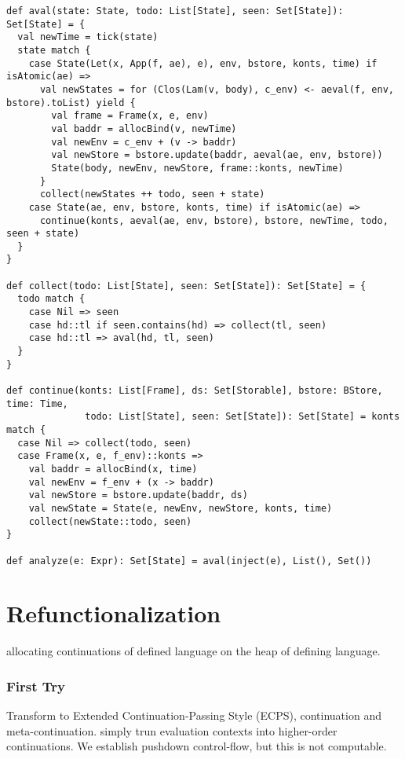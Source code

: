 \documentclass[acmsmall,review,anonymous]{acmart}\settopmatter{printfolios=true,printccs=false,printacmref=false}
\begin{document}
\begin{lstlisting}
def aval(state: State, todo: List[State], seen: Set[State]): Set[State] = { 
  val newTime = tick(state)
  state match {
    case State(Let(x, App(f, ae), e), env, bstore, konts, time) if isAtomic(ae) =>
      val newStates = for (Clos(Lam(v, body), c_env) <- aeval(f, env, bstore).toList) yield {
        val frame = Frame(x, e, env)
        val baddr = allocBind(v, newTime)
        val newEnv = c_env + (v -> baddr)
        val newStore = bstore.update(baddr, aeval(ae, env, bstore))
        State(body, newEnv, newStore, frame::konts, newTime)
      }   
      collect(newStates ++ todo, seen + state)
    case State(ae, env, bstore, konts, time) if isAtomic(ae) =>
      continue(konts, aeval(ae, env, bstore), bstore, newTime, todo, seen + state)
  }   
}

def collect(todo: List[State], seen: Set[State]): Set[State] = { 
  todo match {
    case Nil => seen
    case hd::tl if seen.contains(hd) => collect(tl, seen)
    case hd::tl => aval(hd, tl, seen)
  }   
}

def continue(konts: List[Frame], ds: Set[Storable], bstore: BStore, time: Time,
              todo: List[State], seen: Set[State]): Set[State] = konts match {
  case Nil => collect(todo, seen)
  case Frame(x, e, f_env)::konts =>
    val baddr = allocBind(x, time)
    val newEnv = f_env + (x -> baddr)
    val newStore = bstore.update(baddr, ds) 
    val newState = State(e, newEnv, newStore, konts, time)
    collect(newState::todo, seen)
}

def analyze(e: Expr): Set[State] = aval(inject(e), List(), Set()) 
\end{lstlisting}

\section{Refunctionalization}

allocating continuations of defined language on the heap of defining language.

\subsubsection{First Try}

Transform to Extended Continuation-Passing Style (ECPS), continuation and meta-continuation.
simply trun evaluation contexts into higher-order continuations.
We establish pushdown control-flow, but this is not computable.
\end{document}
